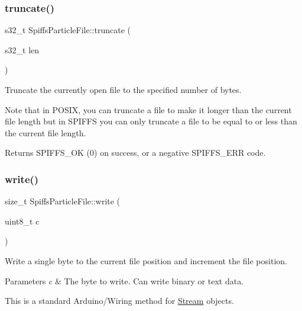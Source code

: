 \subsubsection{\texorpdfstring{truncate()}{truncate()}}
{\footnotesize\ttfamily s32\+\_\+t Spiffs\+Particle\+File\+::truncate (\begin{DoxyParamCaption}\item[{s32\+\_\+t}]{len }\end{DoxyParamCaption})\hspace{0.3cm}{\ttfamily [inline]}}



Truncate the currently open file to the specified number of bytes. 

Note that in P\+O\+S\+IX, you can truncate a file to make it longer than the current file length but in S\+P\+I\+F\+FS you can only truncate a file to be equal to or less than the current file length.

\begin{DoxyReturn}{Returns}
S\+P\+I\+F\+F\+S\+\_\+\+OK (0) on success, or a negative S\+P\+I\+F\+F\+S\+\_\+\+E\+RR code. 
\end{DoxyReturn}
\mbox{\label{class_spiffs_particle_file_a073ab7a5701a616959685c58a79e3391}} 
\subsubsection{\texorpdfstring{write()}{write()}\hspace{0.1cm}{\footnotesize\ttfamily [1/2]}}
{\footnotesize\ttfamily size\+\_\+t Spiffs\+Particle\+File\+::write (\begin{DoxyParamCaption}\item[{uint8\+\_\+t}]{c }\end{DoxyParamCaption})\hspace{0.3cm}{\ttfamily [virtual]}}



Write a single byte to the current file position and increment the file position. 


\begin{DoxyParams}{Parameters}
{\em c} & The byte to write. Can write binary or text data.\\
\hline
\end{DoxyParams}
This is a standard Arduino/\+Wiring method for \mbox{\hyperlink{class_stream}{Stream}} objects. 

